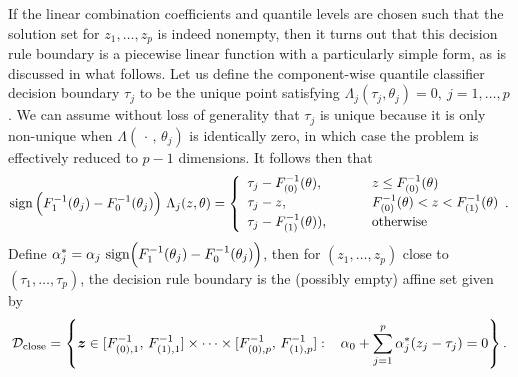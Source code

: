 If the linear combination coefficients and quantile levels are chosen such that
the solution set for $z_1, \dots, z_p$ is indeed nonempty, then it turns out
that this decision rule boundary is a piecewise linear function with a
particularly simple form, as is discussed in what follows.  Let us define the
component-wise quantile classifier decision boundary $\tau_j$ to be the unique
point satisfying $\Lambda_j (\tau_j, \theta_j) = 0,~ j = 1, \dots, p$.  We can
assume without loss of generality that $\tau_j$ is unique because it is only
non-unique when $\Lambda(\,\cdot\,,\, \theta_j)$ is identically zero, in which
case the problem is effectively reduced to $p - 1$ dimensions.  It follows then
that
\begin{equation}
  \label{eq:lambda}
  \sign\Big(F_1^{-1}(\theta_j) - F_0^{-1}(\theta_j)\Big)~ \Lambda_j(z, \theta) =
  \left\{
    \begin{array}{lll}
      \tau_j - F_{(0)}^{-1}(\theta),
      & \hspace{5mm}
      & z \leq F_{(0)}^{-1}(\theta) \\[0.5ex]
      \tau_j - z,
      & \hspace{5mm}
      & F_{(0)}^{-1}(\theta) < z < F_{(1)}^{-1}(\theta) \\[0.5ex]
      \tau_j - F_{(1)}^{-1} (\theta)),
      & \hspace{5mm}
      & \text{otherwise} \\
    \end{array}.
  \right.
\end{equation}
Define
$\alpha_j^{*} = \alpha_j\, \operatorname{sign}\!\Big(F_1^{-1}(\theta_j) -
F_0^{-1}(\theta_j)\Big)$, then for $(z_1, \dots, z_p)$ close to
$(\tau_1, \dots, \tau_p)$, the decision rule boundary is the (possibly empty)
affine set given by
\begin{equation}
  \label{eq:composite-classifiers-close}
  \mathcal{D}_{{\scriptstyle \text{close}}} = \left\{
    \vec{z} \in [F_{(0),1}^{-1},\, F_{(1),1}^{-1}]
    \times \dots \times
    [F_{(0),p}^{-1},\, F_{(1),p}^{-1}] :
    \hspace{3mm}
    \alpha_0 + \sum_{j=1}^p \alpha_j^{*} (z_j - \tau_j) = 0
  \right\} .
\end{equation}

